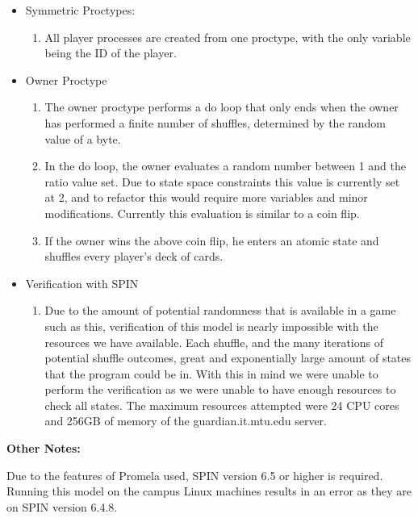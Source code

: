 \documentclass[a4paper,portrait,12pt]{article}
\begin{document}
\begin{center}
\begin{itemize}
		\item Symmetric Proctypes:
			\begin{enumerate}
				\item All player processes are created from one proctype, with the only variable being the ID of the player.
			\end{enumerate}
		\item Owner Proctype
			\begin{enumerate}
				\item The owner proctype performs a do loop that only ends when the owner has performed a finite number of shuffles, determined by the random value of a byte.
				\item In the do loop, the owner evaluates a random number between 1 and the ratio value set.  Due to state space constraints this value is currently set at 2, and to refactor this would require more variables and minor modifications.  Currently this evaluation is similar to a coin flip.
				\item If the owner wins the above coin flip, he enters an atomic state and shuffles every player's deck of cards.
			\end{enumerate}
		\item Verification with SPIN
			\begin{enumerate}
				\item Due to the amount of potential randomness that is available in a game such as this, verification of this model is nearly impossible with the resources we have available.  Each shuffle, and the many iterations of potential shuffle outcomes, great and exponentially large amount of states that the program could be in.  With this in mind we were unable to perform the verification as we were unable to have enough resources to check all states.  The maximum resources attempted were 24 CPU cores and 256GB of memory of the guardian.it.mtu.edu server.  
			\end{enumerate}
	\end{itemize}
	
\begin{flushleft}
	\textbf{Other Notes:}
	
	Due to the features of Promela used, SPIN version 6.5 or higher is required.  Running this model on the campus Linux machines results in an error as they are on SPIN version 6.4.8.  
\end{flushleft}
		
\end{center}
\end{document}
